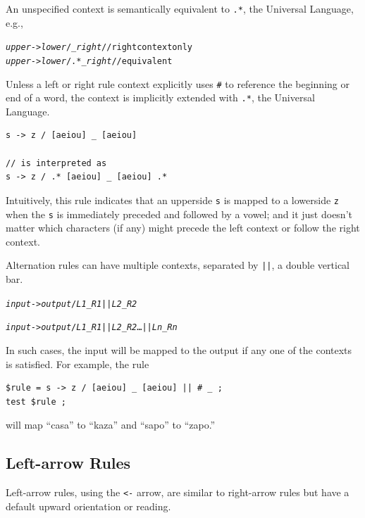 \noindent
An unspecified context is semantically equivalent to \verb!.*!, the Universal
Language, e.g.,

\begin{alltt}
\emph{upper} -> \emph{lower} /    _ \emph{right}	    // right context only
\emph{upper} -> \emph{lower} / .* _ \emph{right}	    // equivalent
\end{alltt}

Unless a left or right rule context explicitly uses \verb!#! to reference the
beginning or end of a word, the context is implicitly extended with
\verb!.*!, the Universal Language.

\begin{Verbatim}
s -> z / [aeiou] _ [aeiou]

// is interpreted as
s -> z / .* [aeiou] _ [aeiou] .*
\end{Verbatim}

\noindent
Intuitively, this rule indicates that
an upperside \texttt{s} is mapped to a lowerside \texttt{z}
when the \texttt{s} is immediately preceded and followed by a vowel; and it
just doesn't matter which characters (if any) might precede the left context or follow
the right context.

Alternation rules can have multiple contexts, separated by \texttt{||}, a double vertical bar.

\begin{alltt}
\emph{input} -> \emph{output} / \emph{L1} _ \emph{R1} || \emph{L2} _ \emph{R2}

\emph{input} -> \emph{output} / \emph{L1} _ \emph{R1} || \emph{L2} _ \emph{R2} \ldots || \emph{Ln} _ \emph{Rn}
\end{alltt}

\noindent
In such cases, the input will be mapped to the output if any one of the
contexts
is satisfied.  For example, the rule

\begin{Verbatim}
$rule = s -> z / [aeiou] _ [aeiou] || # _ ;
test $rule ;
\end{Verbatim}

\noindent
will map ``casa'' to ``kaza'' and ``sapo'' to ``zapo.''

\subsection{Left-arrow Rules}

Left-arrow rules, using the \texttt{<-} arrow, are similar to right-arrow
rules but have a default upward orientation or reading.

